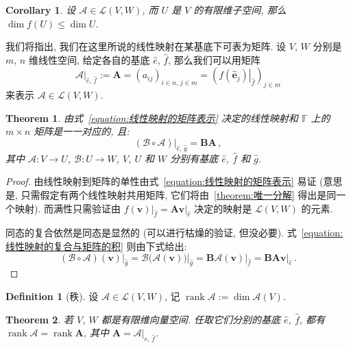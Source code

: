 \documentclass[openany]{ctexbook}
\theoremstyle{plain}
\newtheorem{theorem}{Theorem}[section] %
\newtheorem{corollary}{Corollary} %
\theoremstyle{definition}
\newtheorem{definition}{Definition}[section] %
\newcommand*{\basis}[1]{\hat{\boldsymbol{#1}}} %
\newcommand*{\bv}{\boldsymbol} %
\newcommand*{\inbasis}[2]{\left.%
	{#1}\right|_{#2}
}
\DeclareMathOperator{\rank}{rank}
\begin{document}
\begin{corollary}
	设 $\mathscr A \in \mathcal L (V, W)$, 而 $U$ 是 $V$ 的有限维子空间, 那么 $\dim f(U) \leq \dim U$.
\end{corollary}

我们将指出, 我们在这里所说的线性映射在某基底下可表为矩阵. 
设 $V$, $W$ 分别是 $m$, $n$ 维线性空间, 给定各自的基底 $\hat e$, $\hat f$, 那么我们可以用矩阵
\begin{equation}\label{equation:线性映射的矩阵表示}
	\inbasis{\mathscr A}{\hat e,\, \hat f} 
		:= \bv A = (a_{ij})_{i \in n,\, j \in m}
		= \left( 
			\inbasis{f(\basis e_j)}{\hat f}
		 \right)_{j \in m}
\end{equation}
来表示 $\mathscr A \in \mathcal L (V, W)$. 

\begin{theorem}
	由式~\eqref{equation:线性映射的矩阵表示} 决定的线性映射和 $\mathbb F$ 上的 $m \times n$ 矩阵是一一对应的, 且:
	\begin{equation}\label{equation:线性映射的复合与矩阵的积}
		\inbasis{(\mathscr B \circ \mathscr A)}{\hat e,\, \hat g} = \bv B \bv A\,,
	\end{equation}
	其中 $\mathscr A \colon V \to U$, $\mathscr B \colon U \to W$, $V$, $U$ 和 $W$ 分别有基底 $\hat e$, $\hat f$ 和 $\hat g$.
\end{theorem}
\begin{proof}
	由线性映射到矩阵的单性由式~\eqref{equation:线性映射的矩阵表示} 易证 (意思是, 只需假定有两个线性映射共用矩阵, 它们将由~\ref{theorem:唯一分解} 得出是同一个映射). 而满性只需验证由 $\inbasis{f(\bv v)}{\hat f} = \bv A \inbasis{\bv v}{\hat e}$ 决定的映射是 $\mathcal L(V, W)$ 的元素.

	同态的复合依然是同态是显然的 (可以进行枯燥的验证, 但没必要). 
	式~\eqref{equation:线性映射的复合与矩阵的积} 则由下式给出:
	\begin{equation*}
		\inbasis{(\mathscr B \circ \mathscr A)(\bv v)}{\hat g} 
		= \inbasis{\mathscr B \big(
			\mathscr A(\bv v)\big)}{\hat g}
		= \bv B \inbasis{\mathscr A(\bv v)}{\hat f}
		= \bv B \bv A \inbasis{\bv v}{\hat e}\,.
	\end{equation*}
\end{proof}


\begin{definition}[秩]
	设 $\mathscr A \in \mathcal L(V, W)$, 记 $\rank \mathscr A := \dim \mathscr A(V)$.
\end{definition}

\begin{theorem}
	若 $V$, $W$ 都是有限维向量空间. 任取它们分别的基底 $\hat e$, $\hat f$, 都有 $\rank \mathscr A = \rank \bv A$, 其中 $\bv A = \inbasis{\mathscr A}{\hat e,\, \hat f}$.
\end{theorem}
\end{document}
